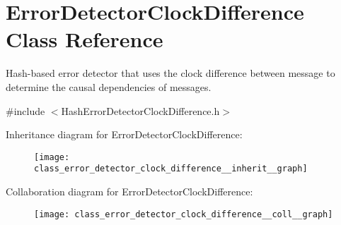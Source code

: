 \hypertarget{class_error_detector_clock_difference}{}\section{Error\+Detector\+Clock\+Difference Class Reference}
\label{class_error_detector_clock_difference}


Hash-\/based error detector that uses the clock difference between message to determine the causal dependencies of messages.  




{\ttfamily \#include $<$Hash\+Error\+Detector\+Clock\+Difference.\+h$>$}



Inheritance diagram for Error\+Detector\+Clock\+Difference\+:
\nopagebreak
\begin{figure}[H]
\begin{center}
\leavevmode
\texttt{[image: class\_error\_detector\_clock\_difference\_\_inherit\_\_graph]}
\end{center}
\end{figure}


Collaboration diagram for Error\+Detector\+Clock\+Difference\+:
\nopagebreak
\begin{figure}[H]
\begin{center}
\leavevmode
\texttt{[image: class\_error\_detector\_clock\_difference\_\_coll\_\_graph]}
\end{center}
\end{figure}
